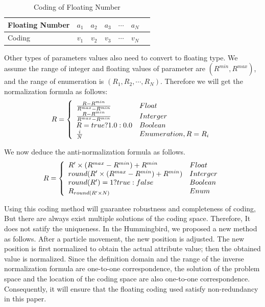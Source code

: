 \begin{table}[!htbp]
\caption{Coding of Floating Number} \label{tab:coding} 
\begin{center}
    \begin{tabular}{l*{5}{c}r}
    \hline
    Floating Number & $a_1$ & $a_2$ & $a_3$ & $\cdots$ & $a_N$ \\
    \hline
    Coding & $v_1$ & $v_2$ & $v_3$ & $\cdots$ & $v_N$  \\
    \hline
    \end{tabular}
\end{center}
\end{table}
\par Other types of parameters values also need to convert to floating type.  We assume the range of integer and floating values of parameter  are  $(R^{min}, R^{max}) $, and the range of enumeration is $(R_1, R_2, \cdots, R_N)$. Therefore we will get the normalization formula as follows:
\begin{equation} 
\small
R = \left\{ 
\begin{array}{l l l l}
\frac{R-  R^{min} }{ R^{max}-R^{min} } & Float \\
\frac{R-  R^{min} }{ R^{max}-R^{min} }  & Interger \\
R= true?1.0 : 0.0 & Boolean \\
\frac{i}{N} & Enumeration, R= R_i  
\end{array} \right.
\end{equation}
\par We now deduce the anti-normalization formula as follows.
\begin{equation}
\small
R = \left\{ 
\begin{array}{l l l l}
R' \times {(R^{max}-R^{min})} +R^{min} & Float\\
round(R' \times (R^{max}-R^{min}) + R^{min})  & Interger\\
round(R')= 1?true : false & Boolean\\
{R_{round(R' \times N)}} & Enum
\end{array} \right.
\end{equation}
\par Using this coding method will guarantee robustness and completeness of coding, But there are always exist multiple solutions of the coding space. Therefore, It does not satify the uniqueness. In the Hummingbird, we proposed a new method as follows. After a particle movement, the new position is adjusted. The new position is first normalized to obtain the actual attribute value; then the obtained value is normalized. Since the definition domain and the range of the inverse normalization formula are one-to-one correspondence, the solution of the problem space and the location of the coding space are also one-to-one correspondence. Consequently, it will ensure that the floating coding used satisfy  non-redundancy in this paper.
